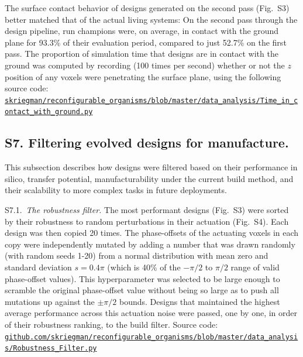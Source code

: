\vspace{1em} 

The surface contact behavior of designs generated on the second pass (Fig.~S3) better matched that of the actual living systems: On the second pass through the design pipeline, run champions were, on average, in contact with the ground plane for 93.3\% of their evaluation period, compared to just 52.7\% on the first pass. The proportion of simulation time that designs are in contact with the ground was computed by recording (100 times per second) whether or not the $z$ position of any voxels were penetrating the surface plane, using the following source code: \\
\href{https://github.com/skriegman/reconfigurable_organisms/blob/master/data_analysis/Time_in_contact_with_ground.py}{\scriptsize\tt\color{blue}skriegman/reconfigurable\_organisms/blob/master/data\_analysis/Time\_in\_contact\_with\_ground.py}

\vspace{1em} 


\subsection*{S7. Filtering evolved designs for manufacture.}

This subsection describes how designs were filtered based on their performance in silico, transfer potential, manufacturability under the current build method, and their scalability to more complex tasks in future deployments.

\vspace{1em}

S7.1.~\textit{The robustness filter.}
The most performant designs (Fig.~S3) were sorted by their robustness to random perturbations in their actuation (Fig.~S4). 
Each design was then copied 20 times. The phase-offsets of the actuating voxels in each copy were independently mutated by adding a number that was drawn randomly (with random seeds 1-20) from a normal distribution with mean zero and standard deviation {$s = 0.4\pi$} (which is 40\% of the {$-\pi/2$} to {$\pi/2$} range of valid phase-offset values). 
This hyperparameter was selected to be large enough to scramble the original phase-offset value without being so large as to push all mutations up against the {$\pm\pi/2$} bounds. 
Designs that maintained the highest average performance across this actuation noise were passed, one by one, in order of their robustness ranking, to the build filter. Source code: \\
\href{https://github.com/skriegman/reconfigurable_organisms/blob/master/data_analysis/Robustness_Filter.py}{\scriptsize\tt\color{blue}github.com/skriegman/reconfigurable\_organisms/blob/master/data\_analysis/Robustness\_Filter.py}

